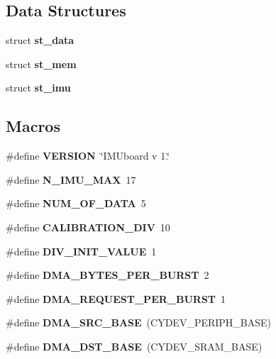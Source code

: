 \subsection*{Data Structures}
\begin{DoxyCompactItemize}
\item 
struct \textbf{ st\+\_\+data}
\item 
struct \textbf{ st\+\_\+mem}
\item 
struct \textbf{ st\+\_\+imu}
\end{DoxyCompactItemize}
\subsection*{Macros}
\begin{DoxyCompactItemize}
\item 
\mbox{\label{globals_8h_a1c6d5de492ac61ad29aec7aa9a436bbf}} 
\#define {\bfseries V\+E\+R\+S\+I\+ON}~\char`\"{}I\+M\+Uboard v 1.\char`\"{}
\item 
\mbox{\label{globals_8h_a8e4d7a571850d3268c9b780b171474e6}} 
\#define {\bfseries N\+\_\+\+I\+M\+U\+\_\+\+M\+AX}~17
\item 
\mbox{\label{globals_8h_a160df9a8c910183dfc855b2e6746f6a3}} 
\#define {\bfseries N\+U\+M\+\_\+\+O\+F\+\_\+\+D\+A\+TA}~5
\item 
\mbox{\label{globals_8h_a80db2dce057c92400a7fb1678bc0b0a8}} 
\#define {\bfseries C\+A\+L\+I\+B\+R\+A\+T\+I\+O\+N\+\_\+\+D\+IV}~10
\item 
\mbox{\label{globals_8h_a14df76a41da04070ee775565e8d67e81}} 
\#define {\bfseries D\+I\+V\+\_\+\+I\+N\+I\+T\+\_\+\+V\+A\+L\+UE}~1
\item 
\mbox{\label{globals_8h_abf6c9afec04b86961e177e0646401ace}} 
\#define {\bfseries D\+M\+A\+\_\+\+B\+Y\+T\+E\+S\+\_\+\+P\+E\+R\+\_\+\+B\+U\+R\+ST}~2
\item 
\mbox{\label{globals_8h_ab4613f8bee68bc68fa6fe94a3ae6d568}} 
\#define {\bfseries D\+M\+A\+\_\+\+R\+E\+Q\+U\+E\+S\+T\+\_\+\+P\+E\+R\+\_\+\+B\+U\+R\+ST}~1
\item 
\mbox{\label{globals_8h_a3cc2eedb40809a1f15ad841c8abbcebf}} 
\#define {\bfseries D\+M\+A\+\_\+\+S\+R\+C\+\_\+\+B\+A\+SE}~(C\+Y\+D\+E\+V\+\_\+\+P\+E\+R\+I\+P\+H\+\_\+\+B\+A\+SE)
\item 
\mbox{\label{globals_8h_aa54e301f446a66cbf8c943d920c8e967}} 
\#define {\bfseries D\+M\+A\+\_\+\+D\+S\+T\+\_\+\+B\+A\+SE}~(C\+Y\+D\+E\+V\+\_\+\+S\+R\+A\+M\+\_\+\+B\+A\+SE)
\item 
\mbox{\label{globals_8h_aea55597952638136c7c929b238904c82}} 

\end{DoxyCompactItemize}
